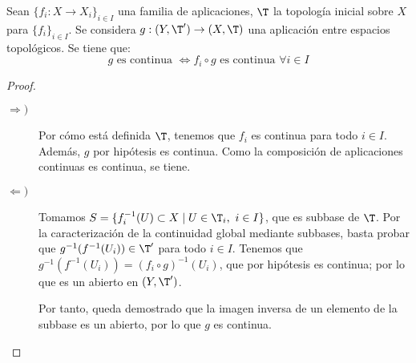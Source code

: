 \begin{prop}
    Sean $\{f_i:X\to X_i\}_{i\in I}$ una familia de aplicaciones, $\T$ la topología inicial sobre $X$ para $\{f_i\}_{i\in I}$. Se considera $g:(Y,\T')\to (X,\T)$ una aplicación entre espacios topológicos. Se tiene que:
    \begin{equation*}
        g \text{ es continua }\Longleftrightarrow f_i\circ g \text{ es continua } \forall i\in I
    \end{equation*}
\end{prop}
\begin{proof}\
\begin{description}
    \item[$\Longrightarrow)$] Por cómo está definida $\T$, tenemos que $f_i$ es continua para todo $i\in I$. Además, $g$ por hipótesis es continua.
    Como la composición de aplicaciones continuas es continua, se tiene.

    \item[$\Longleftarrow)$] Tomamos $S=\{f_i^{-1}(U)\subset X\mid U\in \T_i,~ i\in I\}$, que es subbase de $\T$. Por la caracterización de la continuidad global mediante subbases, basta probar que $g^{-1}(f^{-1}(U_i))\in \T'$ para todo $i\in I$. Tenemos que $g^{-1}(f^{-1}(U_i))=(f_i\circ g)^{-1}(U_i)$, que por hipótesis es continua; por lo que es un abierto en $(Y,\T')$.

    Por tanto, queda demostrado que la imagen inversa de un elemento de la subbase es un abierto, por lo que $g$ es continua.
\end{description}
\end{proof}

